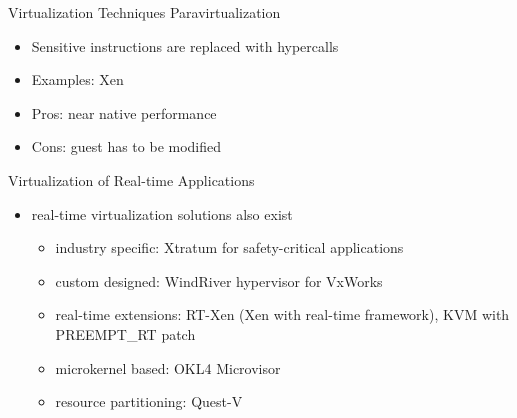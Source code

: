 \documentclass[10pt,hyperref={hyperfootnotes=false}, xcolor={usenames, dvipsnames}]{beamer}
\begin{document}
\begin{frame}{Virtualization Techniques} {Paravirtualization}
  \begin{itemize}
  \item {Sensitive instructions are replaced with hypercalls \pause{}}  
	
	\pause{}
  \item{Examples: Xen} \pause{}
  \item{Pros: near native performance} \pause{}
  \item{Cons: guest has to be modified}

  \end{itemize}
\end{frame}

\begin{frame}{Virtualization of Real-time Applications}
  \begin{itemize}
  \item {real-time virtualization solutions also exist} \pause{}
 		\begin{itemize}
			\item{industry specific: Xtratum for safety-critical applications} \pause{}
			\item{custom designed: WindRiver hypervisor for VxWorks} \pause{}
			\item{real-time extensions: \pause{}RT-Xen (Xen with real-time framework), \pause{}KVM with PREEMPT\_RT patch} \pause{}
			\item{microkernel based: OKL4 Microvisor} \pause{}
			\item{resource partitioning: Quest-V}
		\end{itemize}  
  \end{itemize}
\end{frame}
\end{document}
